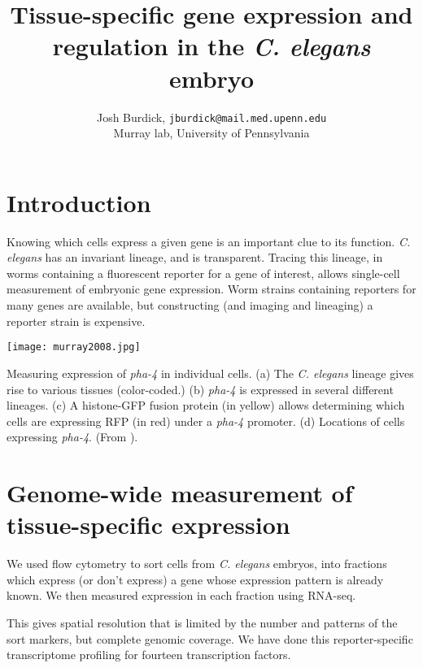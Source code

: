 \documentclass[landscape,a0]{a0poster}
\begin{document}
\thispagestyle{empty}

\title{Tissue-specific gene expression and regulation in the {\em C. elegans} embryo}

\author{Josh Burdick, {\tt jburdick@mail.med.upenn.edu} \\
Murray lab, University of Pennsylvania}
\date{}

\maketitle
\begin{multicols}{4}
\section*{Introduction}
Knowing which cells express a given gene is an important clue to its function.
{\em C. elegans} has an invariant lineage, and is transparent.
Tracing this lineage, in worms containing a fluorescent reporter for a
gene of interest,
allows
single-cell measurement of embryonic gene expression.
Worm strains containing reporters for many genes are available,
but constructing (and imaging and lineaging) a reporter strain is expensive.

\texttt{[image: murray2008.jpg]}

{\small
Measuring expression of {\em pha-4} in individual cells.
(a) The {\em C. elegans} lineage gives rise to various tissues
(color-coded.)
(b) {\em pha-4} is expressed in several different lineages.
(c) A histone-GFP fusion protein (in yellow) allows
determining which cells are expressing RFP (in red)
under a {\em pha-4} promoter. (d) Locations of cells expressing {\em pha-4}.
(From \cite{pmid18587405}).}

\section*{Genome-wide measurement of tissue-specific expression}

We used flow cytometry to sort cells from {\em C. elegans}
embryos, into fractions which
express (or don't express) a gene whose expression pattern is already known.
We then measured expression in
each fraction using RNA-seq.

This gives spatial resolution that is limited by the number and
patterns of the sort markers, but complete genomic coverage. We have
done this reporter-specific transcriptome profiling for fourteen transcription factors.


\end{multicols}
\end{document}
